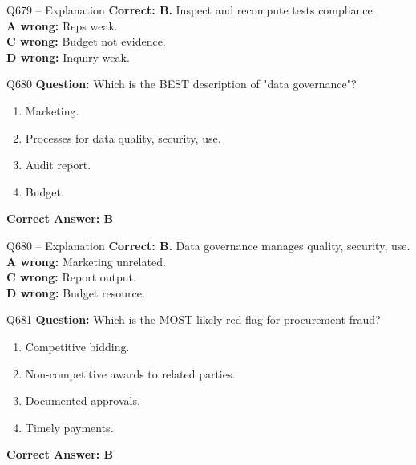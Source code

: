 \documentclass[aspectratio=169,10pt]{beamer}
\begin{document}
	\begin{frame}[t]{Q679 -- Explanation}
		\small
		\textbf{Correct: B.} Inspect and recompute tests compliance. \\[4pt]
		\textbf{A wrong:} Reps weak. \\[2pt]
		\textbf{C wrong:} Budget not evidence. \\[2pt]
		\textbf{D wrong:} Inquiry weak.
	\end{frame}
	
	\begin{frame}[t]{Q680}
		\small
		\textbf{Question:} Which is the BEST description of "data governance"?
		\begin{enumerate}[label=\Alph*.,itemsep=1pt,topsep=2pt]
			\item Marketing.
			\item Processes for data quality, security, use.
			\item Audit report.
			\item Budget.
		\end{enumerate}
		\vspace{4pt}
		\textbf{Correct Answer: B}
	\end{frame}
	
	\begin{frame}[t]{Q680 -- Explanation}
		\small
		\textbf{Correct: B.} Data governance manages quality, security, use. \\[4pt]
		\textbf{A wrong:} Marketing unrelated. \\[2pt]
		\textbf{C wrong:} Report output. \\[2pt]
		\textbf{D wrong:} Budget resource.
	\end{frame}
	
	\begin{frame}[t]{Q681}
		\small
		\textbf{Question:} Which is the MOST likely red flag for procurement fraud?
		\begin{enumerate}[label=\Alph*.,itemsep=1pt,topsep=2pt]
			\item Competitive bidding.
			\item Non-competitive awards to related parties.
			\item Documented approvals.
			\item Timely payments.
		\end{enumerate}
		\vspace{4pt}
		\textbf{Correct Answer: B}
	\end{frame}
	
\end{document}
